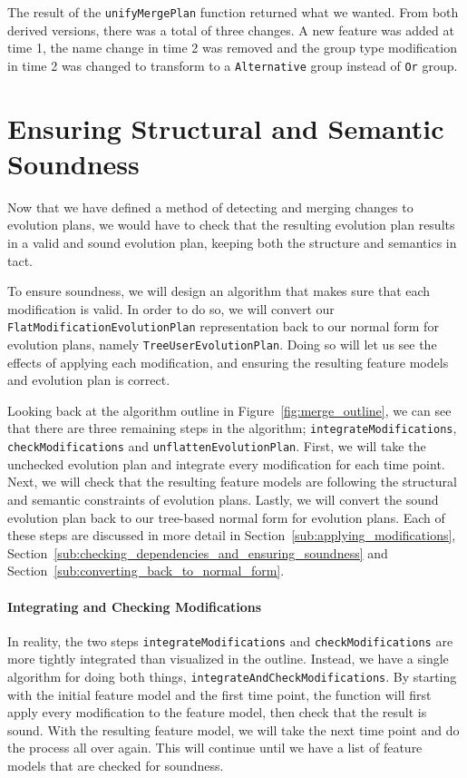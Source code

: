 \documentclass[a4paper,english]{ifimaster}
\begin{document}
The result of the \texttt{unifyMergePlan} function returned what we wanted. From both derived versions, there was a total of three changes. A new feature was added at time 1, the name change in time 2 was removed and the group type modification in time 2 was changed to transform to a \texttt{Alternative} group instead of \texttt{Or} group.

\section{Ensuring Structural and Semantic Soundness}%
\label{sec:ensuring_structural_and_semantic_soundness_of_merge_result}

Now that we have defined a method of detecting and merging changes to evolution plans, we would have to check that the resulting evolution plan results in a valid and sound evolution plan, keeping both the structure and semantics in tact.

To ensure soundness, we will design an algorithm that makes sure that each modification is valid. In order to do so, we will convert our \texttt{FlatModificationEvolutionPlan} representation back to our normal form for evolution plans, namely \texttt{TreeUserEvolutionPlan}. Doing so will let us see the effects of applying each modification, and ensuring the resulting feature models and evolution plan is correct.

Looking back at the algorithm outline in Figure~\vref{fig:merge_outline}, we can see that there are three remaining steps in the algorithm; \texttt{integrateModifications}, \texttt{checkModifications} and \texttt{unflattenEvolutionPlan}. First, we will take the unchecked evolution plan and integrate every modification for each time point. Next, we will check that the resulting feature models are following the structural and semantic constraints of evolution plans. Lastly, we will convert the sound evolution plan back to our tree-based normal form for evolution plans. Each of these steps are discussed in more detail in Section~\ref{sub:applying_modifications}, Section~\ref{sub:checking_dependencies_and_ensuring_soundness} and Section~\ref{sub:converting_back_to_normal_form}. 

\paragraph{Integrating and Checking Modifications}%
\label{par:integrating_and_checking_modifications}

In reality, the two steps \texttt{integrateModifications} and \texttt{checkModifications} are more tightly integrated than visualized in the outline. Instead, we have a single algorithm for doing both things, \texttt{integrateAndCheckModifications}. By starting with the initial feature model and the first time point, the function will first apply every modification to the feature model, then check that the result is sound. With the resulting feature model, we will take the next time point and do the process all over again. This will continue until we have a list of feature models that are checked for soundness.
\end{document}
